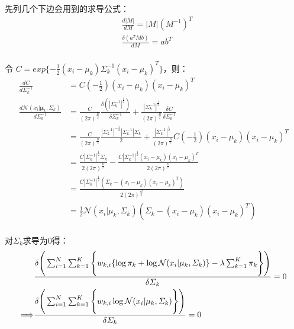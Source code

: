 先列几个下边会用到的求导公式：
\begin{displaymath}
\begin{split}
&\frac{d|M|}{dM} = |M|(M^{-1})^T\\
&\frac{\delta(a^TMb)}{dM} = ab^T\\
\end{split}
\end{displaymath}

令 $C=exp\{-\frac{1}{2}(x_i-\mu_k)\varSigma_k^{-1}(x_i-\mu_k)^T\}$，则：
\begin{displaymath}
\begin{split}
\frac{dC}{d\varSigma_k^{-1}} &= C (-\frac{1}{2})(x_i-\mu_k)(x_i-\mu_k)^T\\
\frac{d
  \mathcal{N}(x_{i}|\mathbf{\mu}_k,\mathbf{\varSigma}_k)}{d\varSigma_k^{-1}}
&= \frac{C}{(2\pi)^{\frac{D}{2}}}
\frac{\delta{(|\varSigma_k^{-1}|^{\frac{1}{2}})}}{\delta{\varSigma_k^{-1}}}
+ \frac{|\varSigma_k^{-1}|^{\frac{1}{2}}}{(2\pi)^{\frac{D}{2}}}
\frac{\delta{C}}{\delta{\varSigma_k^{-1}}}
\\
&= \frac{C}{(2\pi)^{\frac{D}{2}}}
\frac{|\varSigma_k^{-1}|^{-\frac{1}{2}}|\varSigma_k^{-1}|\varSigma_k}{2}
+ \frac{|\varSigma_k^{-1}|^{\frac{1}{2}}}{(2\pi)^{\frac{D}{2}}}
 C (-\frac{1}{2})(x_i-\mu_k)(x_i-\mu_k)^T
\\
&= \frac{C|\varSigma_k^{-1}|^{\frac{1}{2}}\varSigma_k}{2(2\pi)^{\frac{D}{2}}}
- \frac{C|\varSigma_k^{-1}|^{\frac{1}{2}}(x_i-\mu_k)(x_i-\mu_k)^T}
{2(2\pi)^{\frac{D}{2}}}
\\
&= \frac{C|\varSigma_k^{-1}|^{\frac{1}{2}} 
(\varSigma_k - (x_i-\mu_k)(x_i-\mu_k)^T)
}{2(2\pi)^{\frac{D}{2}}}
\\
&=  \frac{1}{2}\mathcal{N}(x_{i}|\mu_k,\varSigma_k)
(\varSigma_k - (x_i-\mu_k)(x_i-\mu_k)^T)
\\
\end{split}
\end{displaymath}

对$\varSigma_k$求导为0得：
\begin{displaymath}
\begin{split}
&\frac{
\delta{ \Bigg{(}
\sum_{i=1}^{N} \sum_{k=1}^{K} 
\Bigg{\{}
w_{k,i} \{ 
\log{\pi_k} + \log{\mathcal{N}(x_{i}|\mu_k,\varSigma_k)} 
\}
-\lambda \sum_{k=1}^{K}{\pi_k} \Bigg{\}} \Bigg{)}
}}{\delta{\varSigma_k}} = 0\\
\Longrightarrow& \frac{
\delta{ \Bigg{(}
\sum_{i=1}^{N} \sum_{k=1}^{K} 
\Bigg{\{}
w_{k,i} \log{\mathcal{N}(x_{i}|\mu_k,\varSigma_k)} 
\Bigg{\}} \Bigg{)}
}}{\delta{\varSigma_k}} = 0
\end{split}
\end{displaymath}

